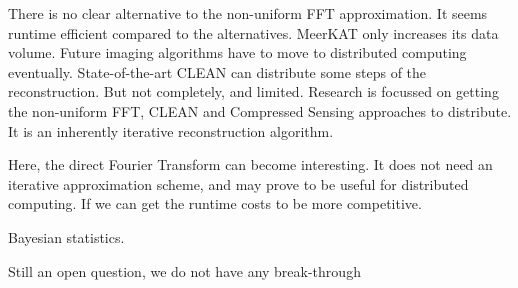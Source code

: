 There is no clear alternative to the non-uniform FFT approximation. It seems runtime efficient compared to the alternatives. MeerKAT only increases its data volume. Future imaging algorithms have to move to distributed computing eventually. State-of-the-art CLEAN can distribute some steps of the reconstruction. But not completely, and limited. Research is focussed on getting the non-uniform FFT, CLEAN and Compressed Sensing approaches to distribute. It is an inherently iterative reconstruction algorithm.

Here, the direct Fourier Transform can become interesting. It does not need an iterative approximation scheme, and may prove to be useful for distributed computing. If we can get the runtime costs to be more competitive.

Bayesian statistics.
 
Still an open question, we do not have any break-through 








